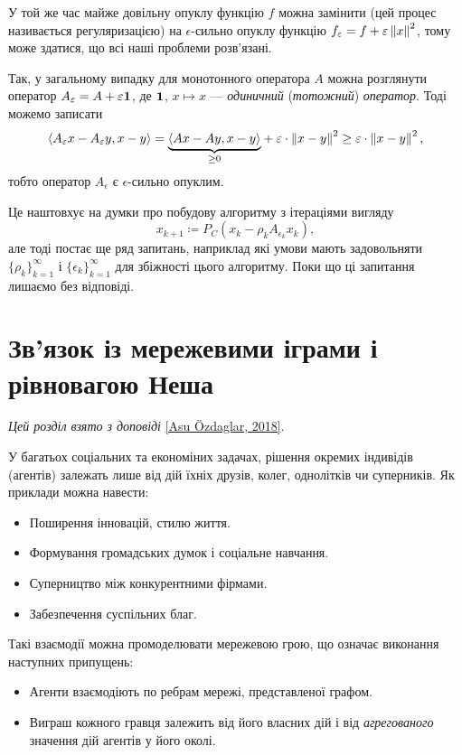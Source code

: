 У той же час майже довільну опуклу функцію $f$ можна замінити (цей процес називається регуляризацією) на $\epsilon$-сильно опуклу функцію $f_\epsilon = f + \epsilon\no{x}^2$, тому може здатися, що всі наші проблеми розв'язані. \medskip

Так, у загальному випадку для монотонного оператора $A$ можна розглянути оператор $A_\epsilon = A + \epsilon {\bf 1}$, де ${\bf 1}$, $x \mapsto x$ --- \emph{одиничний} (\emph{тотожний}) \emph{оператор}. Тоді можемо записати
\begin{equation}
    \sp{A_\epsilon x - A_\epsilon y, x - y} = \underset{\ge 0}{\underbrace{\sp{A x - A y, x - y}}} + \epsilon \cdot \no{x - y}^2 \ge \epsilon \cdot \no{x - y}^2,
\end{equation}
тобто оператор $A_\epsilon$ є $\epsilon$-сильно опуклим. \medskip

Це наштовхує на думки про побудову алгоритму з ітераціями вигляду
\begin{equation}
    x_{k + 1} \coloneqq P_C \left( x_k - \rho_k A_{\epsilon_k} x_k \right),
\end{equation}
але тоді постає ще ряд запитань, наприклад які умови мають задовольняти $\{\rho_k\}_{k = 1}^\infty$ і $\{\epsilon_k\}_{k = 1}^\infty$ для збіжності цього алгоритму. Поки що ці запитання лишаємо без відповіді.

\section{Зв'язок із мережевими іграми і рівновагою Неша}

\emph{Цей розділ взято з доповіді} \href{https://simons.berkeley.edu/talks/asu-ozdaglar-3-28-18}{[Asu \"Ozdaglar, 2018]}. \medskip

У багатьох соціальних та економіних задачах, рішення окремих індивідів (агентів) залежать лише від дій їхніх друзів, колег, однолітків чи суперників. Як приклади можна навести:
\begin{itemize}
    \item Поширення інновацій, стилю життя.
    \item Формування громадських думок і соціальне навчання.
    \item Суперництво між конкурентними фірмами.
    \item Забезпечення суспільних благ.
\end{itemize}

Такі взаємодії можна промоделювати мережевою грою, що означає виконання наступних припущень:
\begin{itemize}
    \item Агенти взаємодіють по ребрам мережі, представленої графом.
    \item Виграш кожного гравця залежить від його власних дій і від \emph{агрегованого} значення дій агентів у його околі.
\end{itemize}

